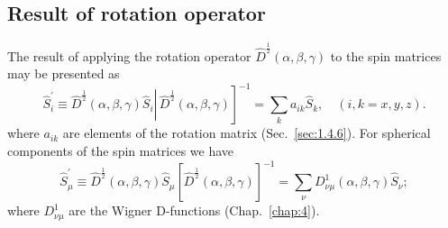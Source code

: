\subsection{Result of rotation operator} The result of applying the rotation operator $\hat{D}^{\frac{1}{2}}(\alpha, \beta, \gamma)$ to the spin matrices may be presented as
\begin{equation}
\left.\left.\widehat{S}_{i}^{\prime} \equiv \widehat{D}^{\frac{1}{2}}(\alpha, \beta, \gamma) \widehat{S}_{i} \right\rvert\, \widehat{D}^{\frac{1}{2}}(\alpha, \beta, \gamma)\right]^{-1}=\sum_{k} a_{i k} \widehat{S}_{k}, \quad(i, k=x, y, z) .\label{eq:2:5:40}
\end{equation}
where $a_{i k}$ are elements of the rotation matrix (Sec.~\ref{sec:1.4.6}). For spherical components of the spin matrices we have
\begin{equation}
\widehat{S}_{\mu}^{\prime} \equiv \widehat{D}^{\frac{1}{2}}(\alpha, \beta, \gamma) \widehat{S}_{\mu}\left[\widehat{D}^{\frac{1}{2}}(\alpha, \beta, \gamma)\right]^{-1}=\sum_{\nu} D_{\nu \mu}^{1}(\alpha, \beta, \gamma) \widehat{S}_{\nu} ; \label{eq:2:5:41}
\end{equation}
where $D_{\nu \mu}^{1}$ are the Wigner D-functions (Chap.~\ref{chap:4}).

